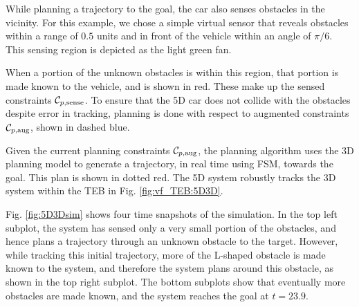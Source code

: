 While planning a trajectory to the goal, the car also senses obstacles in the vicinity.
For this example, we chose a simple virtual sensor that reveals obstacles within a range of $0.5$ units and in front of the vehicle within an angle of $\pi/6$.
This sensing region is depicted as the light green fan.

When a portion of the unknown obstacles is within this region, that portion is made known to the vehicle, and is shown in red.
These make up the sensed constraints $\mathcal C_{p,\text{sense}}$.
To ensure that the 5D car does not collide with the obstacles despite error in tracking, planning is done with respect to augmented constraints $\mathcal C_{p,\text{aug}}$, shown in dashed blue.

Given the current planning constraints $\mathcal C_{p,\text{aug}}$, the planning algorithm uses the 3D planning model to generate a trajectory, in real time using FSM, towards the goal.
This plan is shown in dotted red.
The 5D system robustly tracks the 3D system within the TEB in Fig. \ref{fig:vf_TEB:5D3D}.

Fig. \ref{fig:5D3Dsim} shows four time snapshots of the simulation.
In the top left subplot, the system has sensed only a very small portion of the obstacles, and hence plans a trajectory through an unknown obstacle to the target.
However, while tracking this initial trajectory, more of the L-shaped obstacle is made known to the system, and therefore the system plans around this obstacle, as shown in the top right subplot.
The bottom subplots show that eventually more obstacles are made known, and the system reaches the goal at $t=23.9$.

